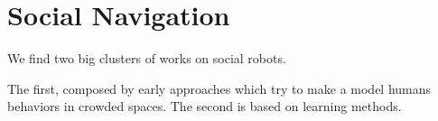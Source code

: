 \section{Social Navigation}\label{sec: social robots}

We find two big clusters of works on social robots.

The first, composed by early approaches which try to make a model humans behaviors in crowded spaces.
%
The second is based on learning methods.

 



